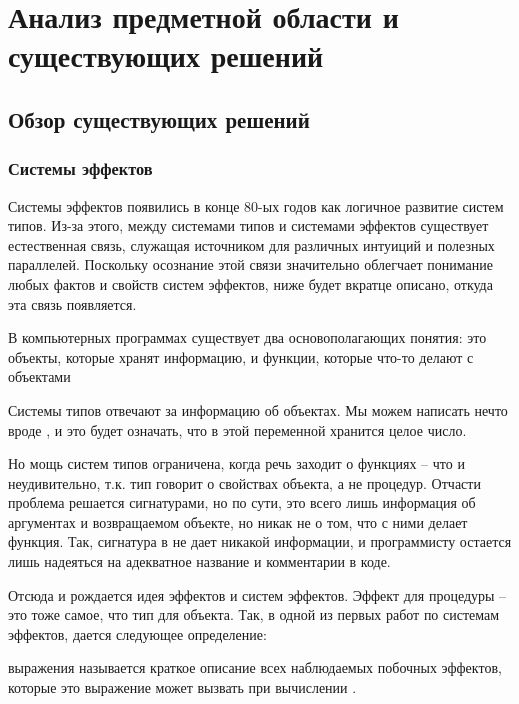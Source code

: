 \section{Анализ предметной области и существующих решений }


\subsection{Обзор существующих решений}


\subsubsection{Системы эффектов}

Системы эффектов появились в конце 80-ых годов как логичное развитие систем типов. Из-за этого, между системами типов и системами эффектов существует естественная связь, служащая источником для различных интуиций и полезных параллелей. Поскольку осознание этой связи значительно облегчает понимание любых фактов и свойств систем эффектов, ниже будет вкратце описано, откуда эта связь появляется.

\bigskip

В компьютерных программах существует два основополагающих понятия: это объекты, которые хранят информацию, и функции, которые что-то делают с объектами

Системы типов отвечают за информацию об объектах. Мы можем написать нечто вроде , и это будет означать, что в этой переменной хранится целое число. 

Но мощь систем типов ограничена, когда речь заходит о функциях -- что и неудивительно, т.к. тип говорит о свойствах объекта, а не процедур. Отчасти проблема решается сигнатурами, но по сути, это всего лишь информация об аргументах и возвращаемом объекте, но никак не о том, что с ними делает функция. Так, сигнатура  в  не дает никакой информации, и программисту остается лишь надеяться на адекватное название и комментарии в коде.

Отсюда и рождается идея эффектов и систем эффектов. Эффект для процедуры -- это тоже самое, что тип для объекта. Так, в одной из первых работ по системам эффектов, дается следующее определение:

\begin{definition}
	 выражения называется краткое описание всех наблюдаемых побочных эффектов, которые это выражение может вызвать при вычислении \cite{Luc88}.
	\label{def-effect}
\end{definition}

